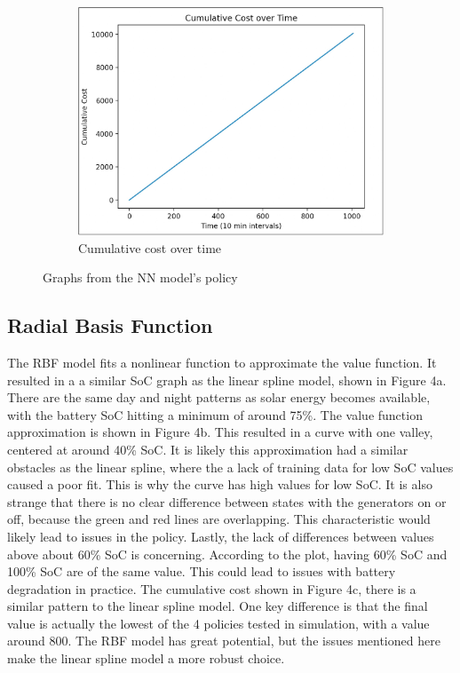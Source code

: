 \documentclass{article}
\begin{document}
\begin{figure}[H]
\begin{subfigure}[b]{0.3\linewidth}
    \includegraphics[width=\linewidth]{pics/nncostvtime.jpg}
    \caption{Cumulative cost over time}
  \end{subfigure}
  \caption{Graphs from the NN model's policy}
  \label{fig:nngraphs}
\end{figure}

\subsection{Radial Basis Function}

The RBF model fits a nonlinear function to approximate the value function. It resulted in a a similar SoC graph as the linear spline model, shown in Figure 4a. There are the same day and night patterns as solar energy becomes available, with the battery SoC hitting a minimum of around 75\%. The value function approximation is shown in Figure 4b. This resulted in a curve with one valley, centered at around 40\% SoC. It is likely this approximation had a similar obstacles as the linear spline, where the a lack of training data for low SoC values caused a poor fit. This is why the curve has high values for low SoC. It is also strange that there is no clear difference between states with the generators on or off, because the green and red lines are overlapping. This characteristic would likely lead to issues in the policy. Lastly, the lack of differences between values above about 60\% SoC is concerning. According to the plot, having 60\% SoC and 100\% SoC are of the same value. This could lead to issues with battery degradation in practice. The cumulative cost shown in Figure 4c, there is a similar pattern to the linear spline model. One key difference is that the final value is actually the lowest of the 4 policies tested in simulation, with a value around 800. The RBF model has great potential, but the issues mentioned here make the linear spline model a more robust choice.
\end{document}
